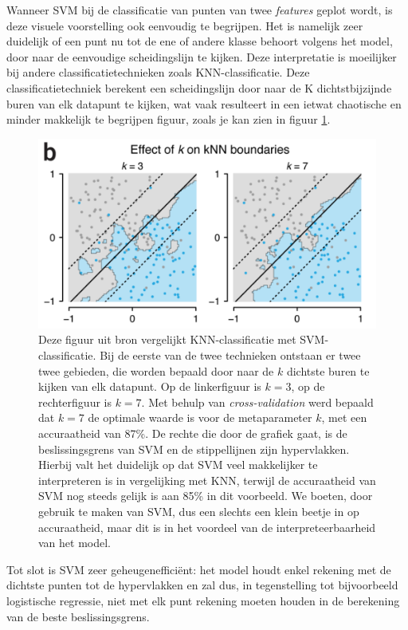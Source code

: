 \documentclass[twoside, kulak]{kulakreport}
\begin{document}
	Wanneer SVM bij de classificatie van punten van twee \textit{features} geplot wordt, is deze visuele voorstelling ook eenvoudig te begrijpen. Het is namelijk zeer duidelijk of een punt nu tot de ene of andere klasse behoort volgens het model, door naar de eenvoudige scheidingslijn te kijken. Deze interpretatie is moeilijker bij andere classificatietechnieken zoals KNN-classificatie. Deze classificatietechniek berekent een scheidingslijn door naar de K dichtstbijzijnde buren van elk datapunt te kijken, wat vaak resulteert in een ietwat chaotische en minder makkelijk te begrijpen figuur, zoals je kan zien in figuur \ref{fig:KNNvsSVM}. 
	
	\begin{figure}
		\centering
		\includegraphics[width=.6\textwidth]{KNN-vs-SVM.PNG}
		\caption{Deze figuur uit bron \cite{bzdok2018machine} vergelijkt KNN-classificatie met SVM-classificatie. Bij de eerste van de twee technieken ontstaan er twee twee gebieden, die worden bepaald door naar de \(k\) dichtste buren te kijken van elk datapunt. Op de linkerfiguur is \(k=3\), op de rechterfiguur is \(k=7\). Met behulp van \textit{cross-validation} werd bepaald dat \(k=7\) de optimale waarde is voor de metaparameter \(k\), met een accuraatheid van 87\%. De rechte die door de grafiek gaat, is de beslissingsgrens van SVM en de stippellijnen zijn hypervlakken. Hierbij valt het duidelijk op dat SVM veel makkelijker te interpreteren is in vergelijking met KNN, terwijl de accuraatheid van SVM nog steeds gelijk is aan 85\% in dit voorbeeld. We boeten, door gebruik te maken van SVM, dus een slechts een klein beetje in op accuraatheid, maar dit is in het voordeel van de interpreteerbaarheid van het model.}
		\label{fig:KNNvsSVM}
	\end{figure}
	
	Tot slot is SVM zeer geheugenefficiënt: het model houdt enkel rekening met de dichtste punten tot de hypervlakken en zal dus, in tegenstelling tot bijvoorbeeld logistische regressie, niet met elk punt rekening moeten houden in de berekening van de beste beslissingsgrens.
	
\end{document}
